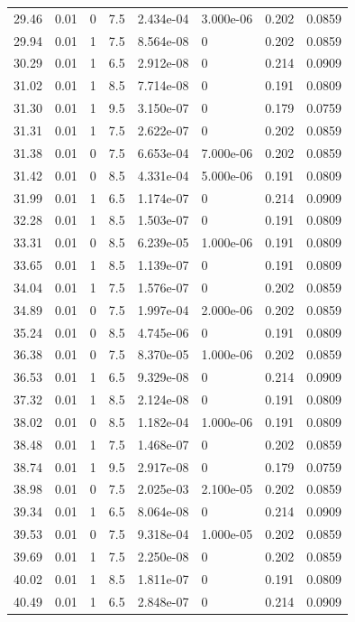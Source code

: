 \documentclass[preview]{standalone}
\begin{document}
{{{\begin{tabular}{L{1.2cm}C{1.2cm} C{0.3cm}C{0.5cm} C{1.4cm}C{1.4cm} C{1.4cm}C{1.4cm}}
  29.46  &  0.01  & 0     & 7.5 &  2.434e-04  & 3.000e-06  & 0.202 &  0.0859   \\ 
  29.94  &  0.01  & 1     & 7.5 &  8.564e-08  & 0  & 0.202 &  0.0859   \\ 
  30.29  &  0.01  & 1     & 6.5 &  2.912e-08  & 0  & 0.214 &  0.0909   \\ 
  31.02  &  0.01  & 1     & 8.5 &  7.714e-08  & 0  & 0.191 &  0.0809   \\ 
  31.30  &  0.01  & 1     & 9.5 &  3.150e-07  & 0  & 0.179 &  0.0759   \\ 
  31.31  &  0.01  & 1     & 7.5 &  2.622e-07  & 0  & 0.202 &  0.0859   \\ 
  31.38  &  0.01  & 0     & 7.5 &  6.653e-04  & 7.000e-06  & 0.202 &  0.0859   \\ 
  31.42  &  0.01  & 0     & 8.5 &  4.331e-04  & 5.000e-06  & 0.191 &  0.0809   \\ 
  31.99  &  0.01  & 1     & 6.5 &  1.174e-07  & 0  & 0.214 &  0.0909   \\ 
  32.28  &  0.01  & 1     & 8.5 &  1.503e-07  & 0  & 0.191 &  0.0809   \\ 
  33.31  &  0.01  & 0     & 8.5 &  6.239e-05  & 1.000e-06  & 0.191 &  0.0809   \\ 
  33.65  &  0.01  & 1     & 8.5 &  1.139e-07  & 0  & 0.191 &  0.0809   \\ 
  34.04  &  0.01  & 1     & 7.5 &  1.576e-07  & 0  & 0.202 &  0.0859   \\ 
  34.89  &  0.01  & 0     & 7.5 &  1.997e-04  & 2.000e-06  & 0.202 &  0.0859   \\ 
  35.24  &  0.01  & 0     & 8.5 &  4.745e-06  & 0  & 0.191 &  0.0809   \\ 
  36.38  &  0.01  & 0     & 7.5 &  8.370e-05  & 1.000e-06  & 0.202 &  0.0859   \\ 
  36.53  &  0.01  & 1     & 6.5 &  9.329e-08  & 0  & 0.214 &  0.0909   \\ 
  37.32  &  0.01  & 1     & 8.5 &  2.124e-08  & 0  & 0.191 &  0.0809   \\ 
  38.02  &  0.01  & 0     & 8.5 &  1.182e-04  & 1.000e-06  & 0.191 &  0.0809   \\ 
  38.48  &  0.01  & 1     & 7.5 &  1.468e-07  & 0  & 0.202 &  0.0859   \\ 
  38.74  &  0.01  & 1     & 9.5 &  2.917e-08  & 0  & 0.179 &  0.0759   \\ 
  38.98  &  0.01  & 0     & 7.5 &  2.025e-03  & 2.100e-05  & 0.202 &  0.0859   \\ 
  39.34  &  0.01  & 1     & 6.5 &  8.064e-08  & 0  & 0.214 &  0.0909   \\ 
  39.53  &  0.01  & 0     & 7.5 &  9.318e-04  & 1.000e-05  & 0.202 &  0.0859   \\ 
  39.69  &  0.01  & 1     & 7.5 &  2.250e-08  & 0  & 0.202 &  0.0859   \\ 
  40.02  &  0.01  & 1     & 8.5 &  1.811e-07  & 0  & 0.191 &  0.0809   \\ 
  40.49  &  0.01  & 1     & 6.5 &  2.848e-07  & 0  & 0.214 &  0.0909   \\ 
\hline 
\end{tabular} 

}}}
\end{document}
